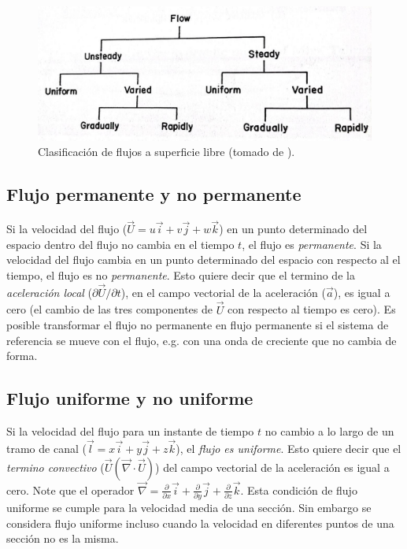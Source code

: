 \documentclass[11pt, oneside]{article}
\begin{document}
\begin{figure}[h]
\centering
\includegraphics[width=\textwidth]{fig4.jpeg}
\caption{Clasificaci\'on de flujos a superficie libre (tomado de \cite{Chau}).}
\label{fig4}
\end{figure}

\subsection{Flujo permanente y no permanente}
Si la velocidad del flujo ($\vec{U}= u\vec{i} + v\vec{j} + w\vec{k}$) en un punto determinado del espacio dentro del flujo no cambia en el tiempo $t$, el flujo es \emph{permanente}. Si la velocidad del flujo cambia en un punto determinado del espacio con respecto al el tiempo, el flujo es no \emph{permanente}. Esto quiere decir que el termino de la \emph{aceleración local} ($\partial{\vec{U}}/\partial{t}$), en el campo vectorial de la aceleración ($\vec{a}$), es igual a cero (el cambio de las tres componentes de $\vec{U}$ con respecto al tiempo es cero). Es posible transformar el flujo no permanente en flujo permanente si el sistema de referencia se mueve con el flujo, e.g. con una onda de creciente que no cambia de forma.  

\subsection{Flujo uniforme y no uniforme}
Si la velocidad del flujo para un instante de tiempo $t$ no cambio a lo largo de un tramo de canal ($\vec{l} = x\vec{i} + y\vec{j} + z\vec{k}$), el \emph{flujo es uniforme}. Esto quiere decir que el \emph{termino convectivo} ($\vec{U} ( \vec{\nabla} \cdot \vec{U} )$) del  campo vectorial de la aceleraci\'on es igual a cero. Note que el operador $\vec{\nabla}=\frac{\partial}{\partial x} \vec{i} + \frac{\partial}{\partial y} \vec{j} + \frac{\partial}{\partial z} \vec{k}$. Esta condici\'on de flujo uniforme se cumple para la velocidad media de una secci\'on. Sin embargo se considera flujo uniforme incluso cuando la velocidad en diferentes puntos de una secci\'on no es la misma. 
\end{document}
